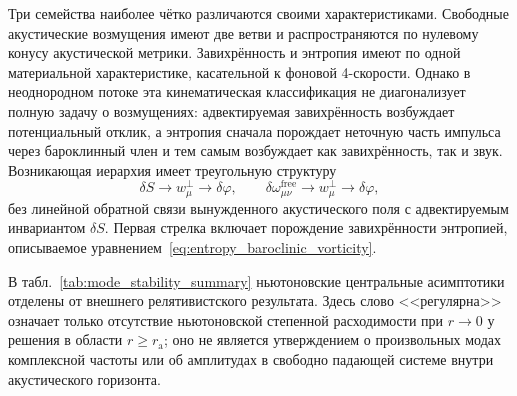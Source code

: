 \documentclass[12pt,a4paper,preprint,nopreprintline]{elsarticle}
\begin{document}
Три семейства наиболее чётко различаются своими характеристиками. Свободные акустические возмущения имеют две ветви и распространяются по нулевому конусу акустической метрики. Завихрённость и энтропия имеют по одной материальной характеристике, касательной к фоновой 4-скорости. Однако в неоднородном потоке эта кинематическая классификация не диагонализует полную задачу о возмущениях: адвектируемая завихрённость возбуждает потенциальный отклик, а энтропия сначала порождает неточную часть импульса через бароклинный член и тем самым возбуждает как завихрённость, так и звук. Возникающая иерархия имеет треугольную структуру
\begin{equation}
    \delta S
    \longrightarrow
    w_{\mu}^{\perp}
    \longrightarrow
    \delta\varphi,
    \qquad
    \delta\omega_{\mu\nu}^{\mathrm{free}}
    \longrightarrow
    w_{\mu}^{\perp}
    \longrightarrow
    \delta\varphi,
    \label{eq:mode_coupling_hierarchy}
\end{equation}
без линейной обратной связи вынужденного акустического поля с адвектируемым инвариантом $\delta S$. Первая стрелка включает порождение завихрённости энтропией, описываемое уравнением~\eqref{eq:entropy_baroclinic_vorticity}.

В табл.~\ref{tab:mode_stability_summary} ньютоновские центральные асимптотики отделены от внешнего релятивистского результата. Здесь слово <<регулярна>> означает только отсутствие ньютоновской степенной расходимости при $r\rightarrow0$ у решения в области $r\geq r_{\mathrm{a}}$; оно не является утверждением о произвольных модах комплексной частоты или об амплитудах в свободно падающей системе внутри акустического горизонта.
\end{document}
